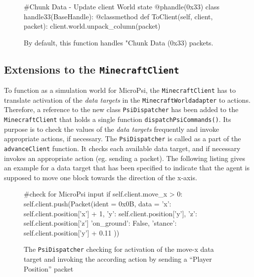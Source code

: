 		\begin{figure}[ht]
			\centering
			\begin{minipage}{11cm}
				\begin{pseudocode}
#Chunk Data - Update client World state
@phandle(0x33)
class handle33(BaseHandle):
	@classmethod
	def ToClient(self, client, packet):
		client.world.unpack_column(packet)
					\end{pseudocode}
				\caption{By default, this function handles "Chunk Data (0x33) packets.}
				\label{packet_handling}
			\end{minipage}
		\end{figure}

        \subsection{Extensions to the \texttt{MinecraftClient}}
        \label{extensions_client}
To function as a simulation world for MicroPsi, the \texttt{MinecraftClient} has to translate activation of the \emph{data targets} in the \texttt{MinecraftWorldadapter} to actions. Therefore, a reference to the new class \texttt{PsiDispatcher} has been added to the \texttt{MinecraftClient} that holds a single function \texttt{dispatchPsiCommands()}. Its purpose is to check the values of the \emph{data targets} frequently and invoke appropriate actions, if necessary. The \texttt{PsiDispatcher} is called as a part of the \texttt{advanceClient} function. It checks each available data target, and if necessary invokes an appropriate action (eg. sending a packet). The following listing gives an example for a data target that has been specified to indicate that the agent is supposed to move one block towards the direction of the x-axis.

		\begin{figure}[ht]
			\centering
			\begin{minipage}{11cm}
				\begin{pseudocode}
#check for MicroPsi input
if self.client.move_x > 0:
    self.client.push(Packet(ident = 0x0B, data = {
        'x': self.client.position['x'] + 1,
        'y': self.client.position['y'],
        'z': self.client.position['z']
        'on_ground': False,
        'stance': self.client.position['y'] + 0.11
        }))
					\end{pseudocode}
				\caption{The \texttt{PsiDispatcher} checking for activation of the move-x data target and invoking the according action by sending a ``Player Position'' packet}
				\label{listing_dispatch}
			\end{minipage}
		\end{figure}

